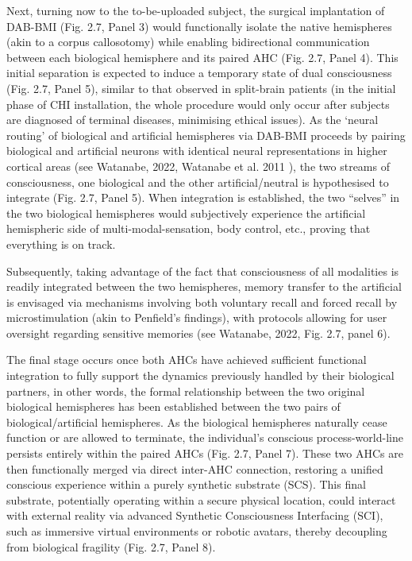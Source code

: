 \documentclass[10pt]{article}
\begin{document}
\begin{sloppypar}
  Next, turning now to the to-be-uploaded subject, the surgical implantation of DAB-BMI (Fig. 2.7, Panel 3) would functionally isolate the native hemispheres (akin to a corpus callosotomy) while enabling bidirectional communication between each biological hemisphere and its paired AHC (Fig. 2.7, Panel 4). This initial separation is expected to induce a temporary state of dual consciousness (Fig. 2.7, Panel 5), similar to that observed in split-brain patients (in the initial phase of CHI installation, the whole procedure would only occur after subjects are diagnosed of terminal diseases, minimising ethical issues). As the ‘neural routing’ of biological and artificial hemispheres via DAB-BMI proceeds by pairing biological and artificial neurons with identical neural representations in higher cortical areas (see Watanabe, 2022, Watanabe et al. 2011 \cite{watanabe2011attention}), the two streams of consciousness, one biological and the other artificial/neutral is hypothesised to integrate (Fig. 2.7, Panel 5). When integration is established, the two “selves” in the two biological hemispheres would subjectively experience the artificial hemispheric side of multi-modal-sensation, body control, etc., proving that everything is on track.

  Subsequently, taking advantage of the fact that consciousness of all modalities is readily integrated between the two hemispheres, memory transfer to the artificial is envisaged via mechanisms involving both voluntary recall and forced recall by microstimulation (akin to Penfield’s findings), with protocols allowing for user oversight regarding sensitive memories (see Watanabe, 2022, Fig. 2.7, panel 6).

  The final stage occurs once both AHCs have achieved sufficient functional integration to fully support the dynamics previously handled by their biological partners, in other words, the formal relationship between the two original biological hemispheres has been established between the two pairs of biological/artificial hemispheres. As the biological hemispheres naturally cease function or are allowed to terminate, the individual’s conscious process-world-line persists entirely within the paired AHCs (Fig. 2.7, Panel 7). These two AHCs are then functionally merged via direct inter-AHC connection, restoring a unified conscious experience within a purely synthetic substrate (SCS). This final substrate, potentially operating within a secure physical location, could interact with external reality via advanced Synthetic Consciousness Interfacing (SCI), such as immersive virtual environments or robotic avatars, thereby decoupling from biological fragility (Fig. 2.7, Panel 8).


\end{sloppypar}
\end{document}
